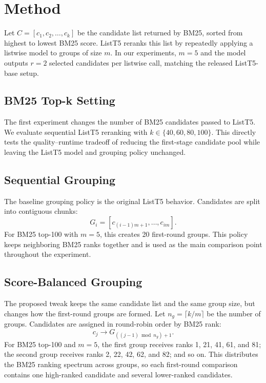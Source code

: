 \section{Method}
\label{sec:method}

Let $C = [c_1, c_2, \ldots, c_k]$ be the candidate list returned by BM25, sorted from highest to lowest BM25 score.
ListT5 reranks this list by repeatedly applying a listwise model to groups of size $m$.
In our experiments, $m=5$ and the model outputs $r=2$ selected candidates per listwise call, matching the released ListT5-base setup.

\subsection{BM25 Top-k Setting}
\label{sec:bm25-topk}

The first experiment changes the number of BM25 candidates passed to ListT5.
We evaluate sequential ListT5 reranking with $k \in \{40, 60, 80, 100\}$.
This directly tests the quality--runtime tradeoff of reducing the first-stage candidate pool while leaving the ListT5 model and grouping policy unchanged.

\subsection{Sequential Grouping}
\label{sec:sequential-grouping}

The baseline grouping policy is the original ListT5 behavior.
Candidates are split into contiguous chunks:
\begin{equation}
G_i = [c_{(i-1)m+1}, \ldots, c_{im}].
\end{equation}
For BM25 top-100 with $m=5$, this creates 20 first-round groups.
This policy keeps neighboring BM25 ranks together and is used as the main comparison point throughout the experiment.

\subsection{Score-Balanced Grouping}
\label{sec:score-balanced-grouping}

The proposed tweak keeps the same candidate list and the same group size, but changes how the first-round groups are formed.
Let $n_g = \lceil k/m \rceil$ be the number of groups.
Candidates are assigned in round-robin order by BM25 rank:
\begin{equation}
c_j \rightarrow G_{((j-1) \bmod n_g) + 1}.
\end{equation}
For BM25 top-100 and $m=5$, the first group receives ranks 1, 21, 41, 61, and 81; the second group receives ranks 2, 22, 42, 62, and 82; and so on.
This distributes the BM25 ranking spectrum across groups, so each first-round comparison contains one high-ranked candidate and several lower-ranked candidates.

